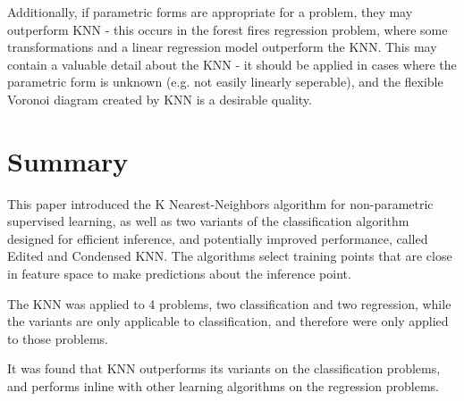 \documentclass{amsart}
\begin{document}
    Additionally, if parametric forms are appropriate for a problem, they may outperform
    KNN - this occurs in the forest fires regression problem, where some transformations
    and a linear regression model outperform the KNN. This may contain a valuable
    detail about the KNN - it should be applied in cases where the parametric form is unknown (e.g.
    not easily linearly seperable), and the flexible Voronoi diagram created by KNN is a desirable quality.

    \section{Summary}
    This paper introduced the K Nearest-Neighbors algorithm for non-parametric supervised learning,
    as well as two variants of the classification algorithm designed for efficient inference, and
    potentially improved performance, called Edited and Condensed KNN. The algorithms select
    training points that are close in feature space to make predictions about the inference point.

    The KNN was applied to 4 problems, two classification and two regression, while the variants
    are only applicable to classification, and therefore were only applied to those problems.

    It was found that KNN outperforms its variants on the classification problems, and performs inline
    with other learning algorithms on the regression problems.




\end{document}
